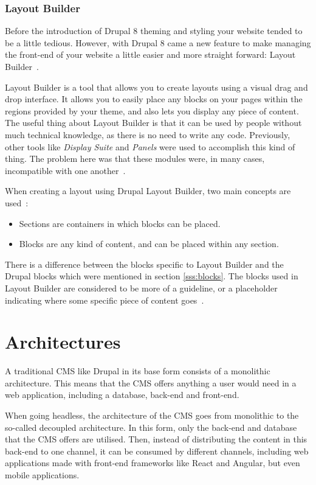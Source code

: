 \subsubsection{Layout Builder}

Before the introduction of Drupal 8 theming and styling your website tended to be a little tedious. However, with Drupal 8 came a new feature to make managing the front-end of your website a little easier and more straight forward: Layout Builder~\autocite{Drupal2021}.

Layout Builder is a tool that allows you to create layouts using a visual drag and drop interface. It allows you to easily place any blocks on your pages within the regions provided by your theme, and also lets you display any piece of content. The useful thing about Layout Builder is that it can be used by people without much technical knowledge, as there is no need to write any code. Previously, other tools like \emph{Display Suite} and \emph{Panels} were used to accomplish this kind of thing. The problem here was that these modules were, in many cases, incompatible with one another~\autocite{Drupalize2022}.

When creating a layout using Drupal Layout Builder, two main concepts are used~\autocite{Drupalize2022}: 
\begin{itemize}
	\item  Sections are containers in which blocks can be placed.
	\item  Blocks are any kind of content, and can be placed within any section.
\end{itemize}
There is a difference between the blocks specific to Layout Builder and the Drupal blocks which were mentioned in section \ref{sss:blocks}. The blocks used in Layout Builder are considered to be more of a guideline, or a placeholder indicating where some specific piece of content goes~\autocite{Drupalize2022}.



\section{Architectures}
A traditional CMS like Drupal in its base form consists of a monolithic architecture. This means that the CMS offers anything a user would need in a web application, including a database, back-end and front-end.

When going headless, the architecture of the CMS goes from monolithic to the so-called decoupled architecture. In this form, only the back-end and database that the CMS offers are utilised. Then, instead of distributing the content in this back-end to one channel, it can be consumed by different channels, including web applications made with front-end frameworks like React and Angular, but even mobile applications.

